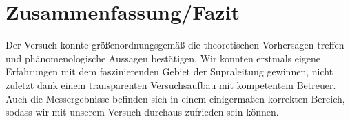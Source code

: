 \section{Zusammenfassung/Fazit}
Der Versuch konnte größenordnungsgemäß die theoretischen Vorhersagen treffen und phänomenologische Aussagen bestätigen. Wir konnten erstmals eigene Erfahrungen mit dem faszinierenden Gebiet der Supraleitung gewinnen, nicht zuletzt dank einem transparenten Versuchsaufbau mit kompetentem Betreuer. Auch die Messergebnisse befinden sich in einem einigermaßen korrekten Bereich, sodass wir mit unserem Versuch durchaus zufrieden sein können.